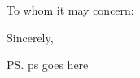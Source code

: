 \documentclass[11pt]{letter}
\begin{document}
\begin{letter}{}

  \date{\today}  
  \opening{To whom it may concern:}

  \lipsum[2-4]

  \closing{Sincerely,}
  \ps{ps goes here}  %
\end{letter}
\end{document}
